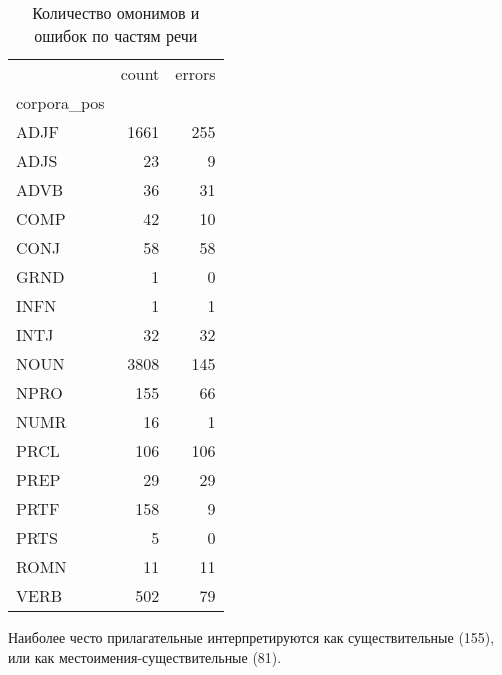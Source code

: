 \documentclass[a4paper,14pt]{article}
\begin{document}
	\begin{table}[h]
		\begin{center}
		\begin{tabular}{lrr}
				\toprule
				{} &  count &  errors \\
				corpora\_pos &        &         \\
				\midrule
				ADJF        &   1661 &     255 \\
				ADJS        &     23 &       9 \\
				ADVB        &     36 &      31 \\
				COMP        &     42 &      10 \\
				CONJ        &     58 &      58 \\
				GRND        &      1 &       0 \\
				INFN        &      1 &       1 \\
				INTJ        &     32 &      32 \\
				NOUN        &   3808 &     145 \\
				NPRO        &    155 &      66 \\
				NUMR        &     16 &       1 \\
				PRCL        &    106 &     106 \\
				PREP        &     29 &      29 \\
				PRTF        &    158 &       9 \\
				PRTS        &      5 &       0 \\
				ROMN        &     11 &      11 \\
				VERB        &    502 &      79 \\
				\bottomrule
				\end{tabular}
		\caption{Количество омонимов и ошибок по частям речи}
		\end{center}
	\end{table}

	Наиболее често прилагательные интерпретируются как существительные (155), или как местоимения-существительные (81).
\end{document}
